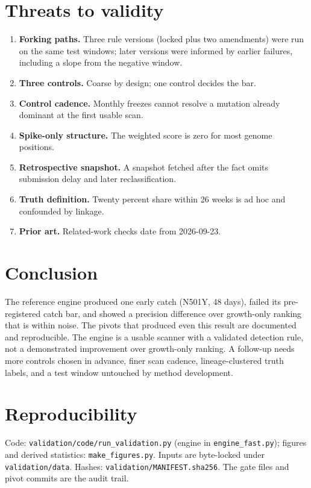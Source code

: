 \documentclass[11pt]{article}
\begin{document}
\section{Threats to validity}
\begin{enumerate}
\item \textbf{Forking paths.} Three rule versions (locked plus two amendments) were run on the same test windows; later versions were informed by earlier failures, including a slope from the negative window.
\item \textbf{Three controls.} Coarse by design; one control decides the bar.
\item \textbf{Control cadence.} Monthly freezes cannot resolve a mutation already dominant at the first usable scan.
\item \textbf{Spike-only structure.} The weighted score is zero for most genome positions.
\item \textbf{Retrospective snapshot.} A snapshot fetched after the fact omits submission delay and later reclassification.
\item \textbf{Truth definition.} Twenty percent share within 26 weeks is ad hoc and confounded by linkage.
\item \textbf{Prior art.} Related-work checks date from 2026-09-23.
\end{enumerate}

\section{Conclusion}
The reference engine produced one early catch (N501Y, 48 days), failed its pre-registered catch bar, and showed a precision difference over growth-only ranking that is within noise. The pivots that produced even this result are documented and reproducible. The engine is a usable scanner with a validated detection rule, not a demonstrated improvement over growth-only ranking. A follow-up needs more controls chosen in advance, finer scan cadence, lineage-clustered truth labels, and a test window untouched by method development.

\section*{Reproducibility}
Code: \texttt{validation/code/run\_validation.py} (engine in \texttt{engine\_fast.py}); figures and derived statistics: \texttt{make\_figures.py}. Inputs are byte-locked under \texttt{validation/data}. Hashes: \texttt{validation/MANIFEST.sha256}. The gate files and pivot commits are the audit trail.
\end{document}
